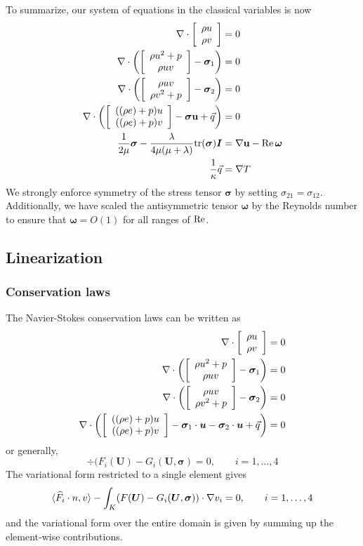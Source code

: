 To summarize, our system of equations in the classical variables is now
\begin{align*}
\div \vecttwo{\rho u }{\rho v} &= 0\\
\div \left(\vecttwo{\rho u^2+p }{\rho u v} - \boldsymbol \sigma_{1}\right) &=0\\
\div \left(\vecttwo{\rho u v}{\rho v^2+p } - \boldsymbol \sigma_{2}\right) &=0\\
\div \left(\vecttwo{((\rho e)+p)u}{((\rho e)+p)v} - \boldsymbol\sigma \mathbf{u} + \vec{q}\right) &=0\\
\frac{1}{2\mu} \boldsymbol \sigma - \frac{\lambda}{4\mu (\mu + \lambda)} { \rm tr}(\boldsymbol \sigma) \boldsymbol I &= \grad \mathbf{u} - \Reyn \, {\boldsymbol \omega}\\
\frac{1}{\kappa}\vec{q} &= \grad T
\end{align*}
We strongly enforce symmetry of the stress tensor $\boldsymbol \sigma$ by setting $\sigma_{21} = \sigma_{12}$. Additionally, we have scaled the antisymmetric tensor $\boldsymbol \omega$ by the Reynolds number to ensure that $\boldsymbol \omega = O(1)$ for all ranges of $\Reyn$.  

\subsection{Linearization}

\subsubsection{Conservation laws}

The Navier-Stokes conservation laws can be written as 
\begin{align*}
\div \vecttwo{\rho u }{\rho v} &= 0\\
\div \left(\vecttwo{\rho u^2+p }{\rho u v} - \boldsymbol \sigma_{1}\right) &=0\\
\div \left(\vecttwo{\rho u v}{\rho v^2+p } - \boldsymbol \sigma_{2}\right) &=0\\
\div \left(\vecttwo{((\rho e)+p)u}{((\rho e)+p)v} - \boldsymbol \sigma_1 \cdot \boldsymbol u- \boldsymbol \sigma_2 \cdot \boldsymbol u + \vec{q}\right) &=0
\end{align*}
or generally, 
\[
\div (F_i(\boldsymbol U)-G_i(\boldsymbol U,\boldsymbol \sigma) = 0, \qquad i = 1,\ldots, 4
\]
The variational form restricted to a single element gives
\[
\langle \widehat{F}_i\cdot n, v\rangle - \int_K  (F(\boldsymbol U)-G_i(\boldsymbol U,\boldsymbol \sigma)) \cdot \grad v_i = 0 , \qquad i = 1,\ldots, 4
\]
and the variational form over the entire domain is given by summing up the element-wise contributions. 

